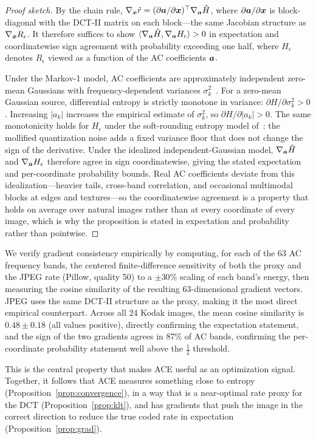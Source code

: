 \begin{proof}[Proof sketch]
By the chain rule, $\nabla_{\boldsymbol{x}}\hat{r} = (\partial\boldsymbol{a}/\partial\boldsymbol{x})^\top\nabla_{\boldsymbol{a}}\hat{H}$, where $\partial\boldsymbol{a}/\partial\boldsymbol{x}$ is block-diagonal with the DCT-II matrix on each block---the same Jacobian structure as $\nabla_{\boldsymbol{x}} R_\epsilon$.
It therefore suffices to show $\langle\nabla_{\boldsymbol{a}}\hat{H},\nabla_{\boldsymbol{a}} H_\epsilon\rangle > 0$ in expectation and coordinatewise sign agreement with probability exceeding one half, where $H_\epsilon$ denotes $R_\epsilon$ viewed as a function of the AC coefficients $\boldsymbol{a}$.

Under the Markov-1 model, AC coefficients are approximately independent zero-mean Gaussians with frequency-dependent variances $\sigma_k^2$~\citep{clarke1985transform}.
For a zero-mean Gaussian source, differential entropy is strictly monotone in variance: $\partial H / \partial \sigma_k^2 > 0$.
Increasing $|a_k|$ increases the empirical estimate of $\sigma_k^2$, so $\partial H / \partial |a_k| > 0$.
The same monotonicity holds for $H_\epsilon$ under the soft-rounding entropy model of~\citet{balle2018variational}: the mollified quantization noise adds a fixed variance floor that does not change the sign of the derivative.
Under the idealized independent-Gaussian model, $\nabla_{\boldsymbol{a}}\hat{H}$ and $\nabla_{\boldsymbol{a}} H_\epsilon$ therefore agree in sign coordinatewise, giving the stated expectation and per-coordinate probability bounds.
Real AC coefficients deviate from this idealization---heavier tails, cross-band correlation, and occasional multimodal blocks at edges and textures---so the coordinatewise agreement is a property that holds on average over natural images rather than at every coordinate of every image, which is why the proposition is stated in expectation and probability rather than pointwise.
\end{proof}

We verify gradient consistency empirically by computing, for each of the 63 AC frequency bands, the centered finite-difference sensitivity of both the proxy and the JPEG rate (Pillow, quality 50) to a $\pm30\%$ scaling of each band's energy, then measuring the cosine similarity of the resulting 63-dimensional gradient vectors.
JPEG uses the same DCT-II structure as the proxy, making it the most direct empirical counterpart.
Across all 24 Kodak images, the mean cosine similarity is $0.48 \pm 0.18$ (all values positive), directly confirming the expectation statement, and the sign of the two gradients agrees in 87\% of AC bands, confirming the per-coordinate probability statement well above the $\tfrac12$ threshold.

This is the central property that makes ACE useful as an optimization signal.
Together, it follows that ACE measures something close to entropy (Proposition~\ref{prop:convergence}), in a way that is a near-optimal rate proxy for the DCT (Proposition~\ref{prop:klt}), and has gradients that push the image in the correct direction to reduce the true coded rate in expectation (Proposition~\ref{prop:grad}).